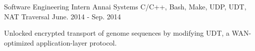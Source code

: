 \begin{cventries}
  \cventry
    {Software Engineering Intern} %
    {Annai Systems} %
    {C/C++, Bash, Make, UDP, UDT, NAT Traversal} %
    {June. 2014 - Sep. 2014} %
    {
      \begin{cvitems} %
        \item {Unlocked encrypted transport of genome sequences by modifying UDT, a WAN-optimized application-layer protocol.}
      \end{cvitems}
    }

\end{cventries}
